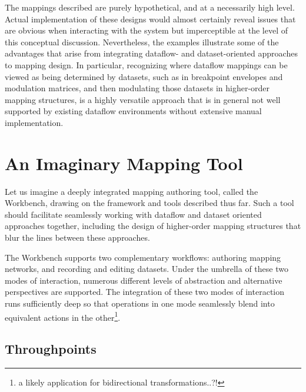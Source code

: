\documentclass[main.tex]{subfiles}
\begin{document}
The mappings described are purely hypothetical, and at a necessarily high level.
Actual implementation of these designs would almost certainly reveal issues
that are obvious when interacting with the system but imperceptible at the
level of this conceptual discussion. Nevertheless, the examples illustrate
some of the advantages that arise from integrating dataflow- and dataset-oriented
approaches to mapping design. In particular, recognizing where dataflow mappings
can be viewed as being determined by datasets, such as in breakpoint envelopes
and modulation matrices, and then modulating those datasets in higher-order
mapping structures, is a highly versatile approach that is in general not well
supported by existing dataflow environments without extensive manual implementation.

\section{An Imaginary Mapping Tool}

Let us imagine a deeply integrated mapping authoring tool,
called the Workbench, drawing on the framework and tools described thus far. Such
a tool should facilitate seamlessly working with dataflow and dataset oriented approaches
together, including the design of higher-order mapping structures that blur the lines
between these approaches.

The Workbench supports two complementary workflows: authoring mapping networks,
and recording and editing datasets. Under the umbrella of these two modes of interaction,
numerous different levels of abstraction and alternative perspectives are supported.
The integration of these two modes of interaction runs sufficiently deep so that
operations in one mode seamlessly blend into equivalent actions in the other\footnote{a
likely application for bidirectional transformations..?!}.

\subsection{Throughpoints}
\end{document}
